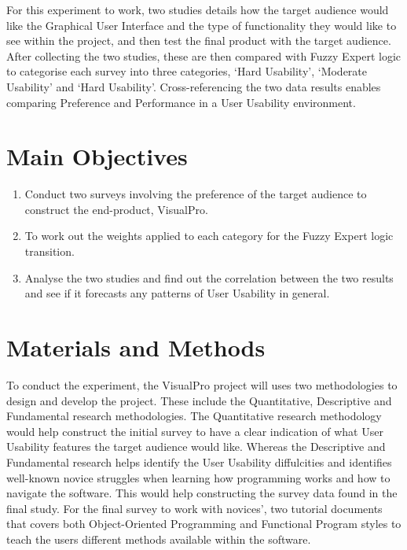 \documentclass[a0,portrait]{a0poster}
\begin{document}
\begin{multicols}{2}
    For this experiment to work, two studies details how the target audience would like the Graphical User Interface and the type of functionality they would like to see within the project, and then test the final product with the target audience. After collecting the two studies, these are then compared with Fuzzy Expert logic to categorise each survey into three categories, `Hard Usability', `Moderate Usability' and `Hard Usability'. Cross-referencing the two data results enables comparing Preference and Performance in a User Usability environment. 


\color{DarkSlateGray} %

\section*{Main Objectives}

\begin{enumerate}
\item Conduct two surveys involving the preference of the target audience to construct the end-product, VisualPro.
\item To work out the weights applied to each category for the Fuzzy Expert logic transition.
\item Analyse the two studies and find out the correlation between the two results and see if it forecasts any patterns of User Usability in general.
\end{enumerate}


\section*{Materials and Methods}
To conduct the experiment, the VisualPro project will uses two methodologies to design and develop the project. These include the Quantitative, Descriptive and Fundamental research methodologies. The Quantitative research methodology would help construct the initial survey to have a clear indication of what User Usability features the target audience would like. Whereas the Descriptive and Fundamental research helps identify the User Usability diffulcities and identifies well-known novice struggles when learning how programming works and how to navigate the software. This would help constructing the survey data found in the final study. For the final survey to work with novices', two tutorial documents that covers both Object-Oriented Programming and Functional Program styles to teach the users different methods available within the software.


\end{multicols}
\end{document}
